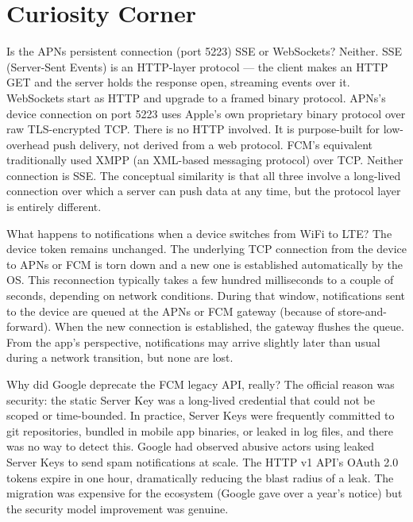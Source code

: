 \documentclass[11pt,a4paper]{article}
\begin{document}
\section{Curiosity Corner}

\begin{curiobox}{Is the APNs persistent connection (port 5223) SSE or WebSockets?}
Neither. SSE (Server-Sent Events) is an HTTP-layer protocol --- the client makes an HTTP GET and the server holds the response open, streaming events over it. WebSockets start as HTTP and upgrade to a framed binary protocol. APNs's device connection on port 5223 uses Apple's own proprietary binary protocol over raw TLS-encrypted TCP. There is no HTTP involved. It is purpose-built for low-overhead push delivery, not derived from a web protocol. FCM's equivalent traditionally used XMPP (an XML-based messaging protocol) over TCP. Neither connection is SSE. The conceptual similarity is that all three involve a long-lived connection over which a server can push data at any time, but the protocol layer is entirely different.
\end{curiobox}

\begin{curiobox}{What happens to notifications when a device switches from WiFi to LTE?}
The device token remains unchanged. The underlying TCP connection from the device to APNs or FCM is torn down and a new one is established automatically by the OS. This reconnection typically takes a few hundred milliseconds to a couple of seconds, depending on network conditions. During that window, notifications sent to the device are queued at the APNs or FCM gateway (because of store-and-forward). When the new connection is established, the gateway flushes the queue. From the app's perspective, notifications may arrive slightly later than usual during a network transition, but none are lost.
\end{curiobox}

\begin{curiobox}{Why did Google deprecate the FCM legacy API, really?}
The official reason was security: the static Server Key was a long-lived credential that could not be scoped or time-bounded. In practice, Server Keys were frequently committed to git repositories, bundled in mobile app binaries, or leaked in log files, and there was no way to detect this. Google had observed abusive actors using leaked Server Keys to send spam notifications at scale. The HTTP v1 API's OAuth 2.0 tokens expire in one hour, dramatically reducing the blast radius of a leak. The migration was expensive for the ecosystem (Google gave over a year's notice) but the security model improvement was genuine.
\end{curiobox}
\end{document}
